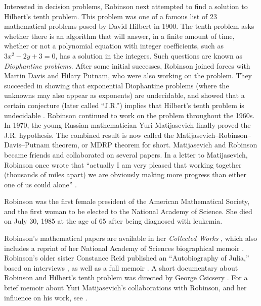 \documentclass[../../../include/open-logic-section]{subfiles}
\begin{document}
Interested in decision problems, Robinson next attempted to find a
solution to Hilbert's tenth problem. This problem was one of a famous
list of 23 mathematical problems posed by David Hilbert in 1900. The
tenth problem asks whether there is an algorithm that will answer, in
a finite amount of time, whether or not a polynomial equation with
integer coefficients, such as $3x^2 - 2y +3 = 0$, has a solution in
the integers. Such questions are known as \emph{Diophantine problems}.
After some initial successes, Robinson joined forces with Martin Davis
and Hilary Putnam, who were also working on the problem. They
succeeded in showing that exponential Diophantine problems (where the
unknowns may also appear as exponents) are undecidable, and showed
that a certain conjecture (later called ``J.R.'')  implies that
Hilbert's tenth problem is undecidable
\citep{DavisPutnamRobinson1961}.  Robinson continued to work on the
problem throughout the 1960s.  In 1970, the young Russian
mathematician Yuri Matijasevich finally proved the J.R. hypothesis.
The combined result is now called the
Matijasevich--Robinson--Davis--Putnam theorem, or MDRP theorem for short.
Matijasevich and Robinson became friends and collaborated on several
papers. In a letter to Matijasevich, Robinson once wrote that
``actually I am very pleased that working together (thousands of miles
apart) we are obviously making more progress than either one of us
could alone'' \citep[45]{Matijasevich1992}.

Robinson was the first female president of the American Mathematical
Society, and the first woman to be elected to the National
Academy of Science. She died on July 30, 1985 at the age of 65 after
being diagnosed with leukemia.

\begin{reading}
Robinson's mathematical papers are available in her \textit{Collected
  Works} \citep{Robinson1996}, which also includes a reprint of her
National Academy of Sciences biographical memoir
\citep{Feferman1994}. Robinson's older sister Constance Reid published
an ``Autobiography of Julia,'' based on interviews \citep{Reid1986},
as well as a full memoir \citep{Reid1996}. A short documentary about
Robinson and Hilbert's tenth problem was directed by George Csicsery
\citep{Csicsery2016}. For a brief memoir about Yuri Matijasevich's
collaborations with Robinson, and her influence on his work, see
\citep{Matijasevich1992}.
\end{reading}
\end{document}
